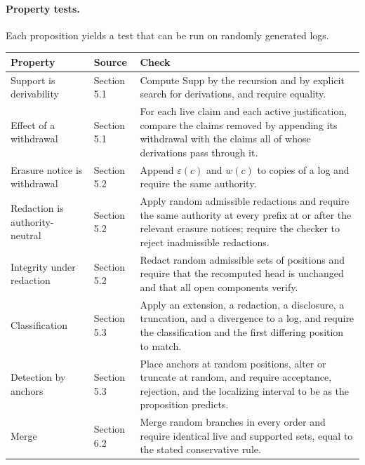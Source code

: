 \documentclass[11pt]{article}
\theoremstyle{plain}
\theoremstyle{definition}
\theoremstyle{remark}
\begin{document}
\paragraph{Property tests.} Each proposition yields a test that can be run on randomly generated logs.

\begin{center}
\small
\begin{tabular}{|p{}|p{}|p{}|}
\hline
Property & Source & Check \\
\hline
Support is derivability & Section 5.1 & Compute $\mathrm{Supp}$ by the recursion and by explicit search for derivations, and require equality. \\
\hline
Effect of a withdrawal & Section 5.1 & For each live claim and each active justification, compare the claims removed by appending its withdrawal with the claims all of whose derivations pass through it. \\
\hline
Erasure notice is withdrawal & Section 5.2 & Append $\varepsilon(c)$ and $w(c)$ to copies of a log and require the same authority. \\
\hline
Redaction is authority-neutral & Section 5.2 & Apply random admissible redactions and require the same authority at every prefix at or after the relevant erasure notices; require the checker to reject inadmissible redactions. \\
\hline
Integrity under redaction & Section 5.2 & Redact random admissible sets of positions and require that the recomputed head is unchanged and that all open components verify. \\
\hline
Classification & Section 5.3 & Apply an extension, a redaction, a disclosure, a truncation, and a divergence to a log, and require the classification and the first differing position to match. \\
\hline
Detection by anchors & Section 5.3 & Place anchors at random positions, alter or truncate at random, and require acceptance, rejection, and the localizing interval to be as the proposition predicts. \\
\hline
Merge & Section 6.2 & Merge random branches in every order and require identical live and supported sets, equal to the stated conservative rule. \\
\hline
\end{tabular}
\end{center}
\end{document}
